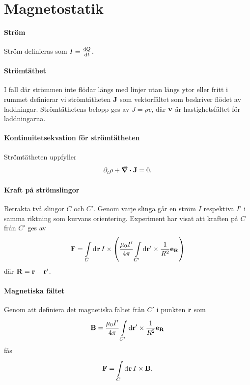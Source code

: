 \section{Magnetostatik}

\paragraph{Ström}
Ström definieras som $I = \dv{Q}{t}$.

\paragraph{Strömtäthet}
I fall där strömmen inte flödar längs med linjer utan längs ytor eller fritt i rummet definierar vi strömtätheten $\vb{J}$ som vektorfältet som beskriver flödet av laddningar. Strömtäthetens belopp ges av $J = \rho v$, där $\vb{v}$ är hastighetsfältet för laddningarna.

\paragraph{Kontinuitetsekvation för strömtätheten}
Strömtätheten uppfyller
\begin{align*}
	\partial_{t}^{}\rho + \div{\vb{J}} = 0.
\end{align*}

\paragraph{Kraft på strömslingor}
Betrakta två slingor $C$ och $C'$. Genom varje slinga går en ström $I$ respektiva $I'$ i samma riktning som kurvans orientering. Experiment har visat att kraften på $C$ från $C'$ ges av
\begin{align*}
	\vb{F} = \int\limits_{C}^{}\dd[]{\vb{r}}I\times\left(\frac{\mu_{0}I'}{4\pi}\int\limits_{C'}^{}\dd{\vb{r'}}\times \frac{1}{R^{2}}\vb{e}_{\vb{R}}\right)
\end{align*}
där $\vb{R} = \vb{r} - \vb{r}'$.

\paragraph{Magnetiska fältet}
Genom att definiera det magnetiska fältet från $C'$ i punkten $\vb{r}$ som
\begin{align*}
	\vb{B} = \frac{\mu_{0}I'}{4\pi}\int\limits_{C'}^{}\dd{\vb{r'}}\times \frac{1}{R^{2}}\vb{e}_{\vb{R}}
\end{align*}
fås
\begin{align*}
	\vb{F} = \int\limits_{C}^{}\dd[]{\vb{r}}I\times\vb{B}.
\end{align*}

